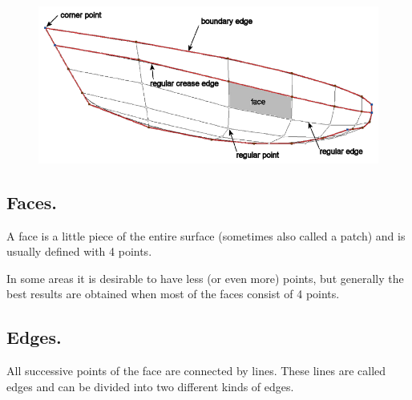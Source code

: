 \documentclass[12pt]{article}
\begin{document}
\begin{figure}[h]
        \centering
        \includegraphics[width=15cm,natwidth=769,natheight=355]{figure1.png}
        \caption{}
        \label{fig:mesh}
\end{figure}

\subsection{Faces.}
A face is a little piece of the entire surface (sometimes also called
a patch) and is usually defined with 4 points.\par In some areas it is
desirable to have less (or even more) points, but generally the best
results are obtained when most of the faces consist of 4 points.

\subsection{Edges.}
All successive points of the face are connected by lines. These lines
are called edges and can be divided into two different kinds of edges.
\end{document}
